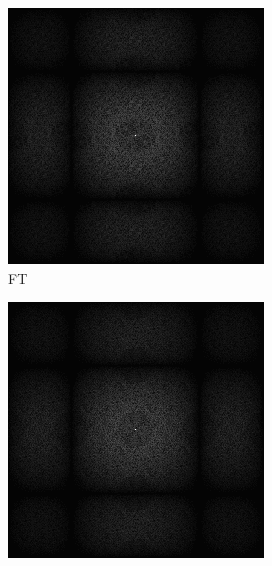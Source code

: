 \begin{figure}[H]
\begin{tcolorbox}[boxrule=4pt,sharp corners=downhill,title=Szene unter Kamerabewegung, fonttitle=\bfseries]
\begin{tcolorbox}[boxrule=4pt,sharp corners=downhill,title=Keine Projektion,colbacktitle=blue!50!white, coltitle=black]
\begin{subfigure}[b]{0.2\linewidth}
      \includegraphics[width=\linewidth]{content/TemporalerAlg/Bilder/Reprojection/NoTemporalRepr/Ausschnitte/Ausschnitt2_FFT.png}
      \caption{FT}
      \label{pic:NoTemporalRepr_2_FFT}
    \end{subfigure}
    \begin{subfigure}[b]{0.2\linewidth}
      \includegraphics[width=\linewidth]{content/TemporalerAlg/Bilder/Reprojection/NoTemporalRepr/Ausschnitte/Ausschnitt3_FFT.png}

\end{subfigure}
\end{tcolorbox}
\end{tcolorbox}
\end{figure}
